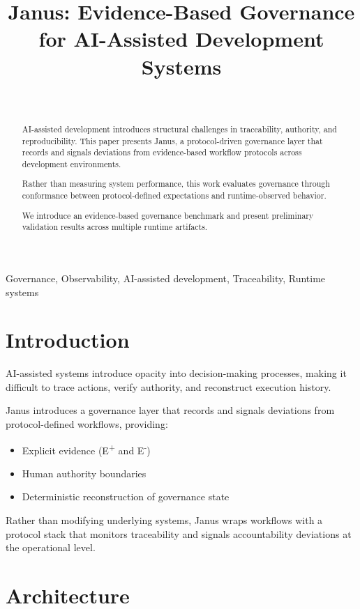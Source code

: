 \documentclass[conference]{IEEEtran}
\title{Janus: Evidence-Based Governance for AI-Assisted Development Systems}
\author{%
  \IEEEauthorblockN{Martín Nicolás Sánchez Morales}\\
  \IEEEauthorblockA{Janus Governance Project\\
  Argentina}%
}
\begin{document}
\maketitle

\begin{abstract}
AI-assisted development introduces structural challenges in traceability, authority,
and reproducibility. This paper presents Janus, a protocol-driven governance layer
that records and signals deviations from evidence-based workflow protocols across
development environments.

Rather than measuring system performance, this work evaluates governance through
conformance between protocol-defined expectations and runtime-observed behavior.

We introduce an evidence-based governance benchmark and present preliminary
validation results across multiple runtime artifacts.
\end{abstract}

\begin{IEEEkeywords}
Governance, Observability, AI-assisted development, Traceability, Runtime systems
\end{IEEEkeywords}

\section{Introduction}

AI-assisted systems introduce opacity into decision-making processes, making it
difficult to trace actions, verify authority, and reconstruct execution history.

Janus introduces a governance layer that records and signals deviations from
protocol-defined workflows, providing:
\begin{itemize}
    \item Explicit evidence (E\textsuperscript{+} and E\textsuperscript{-})
    \item Human authority boundaries
    \item Deterministic reconstruction of governance state
\end{itemize}

Rather than modifying underlying systems, Janus wraps workflows with a protocol
stack that monitors traceability and signals accountability deviations at the operational level.

\section{Architecture}
\end{document}
